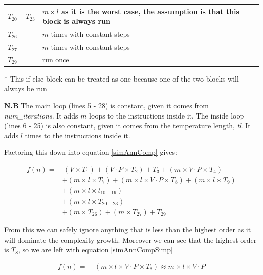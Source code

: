 \documentclass[12pt]{report}
\begin{document}
\begin{table}[H]
\begin{tabular}{@{}|l|l|@{}}
$T_{20} - T_{23}$ & $m \times l$ as it is the worst case, the assumption is that this block is always run                                       \\ \midrule
$T_{26}$          & $m$ times with constant steps                                                                                               \\ \midrule
$T_{27}$          & $m$ times with constant steps                                                                                               \\ \midrule
$T_{29}$          & run once                                                                                                                    \\ \bottomrule
\end{tabular}
\end{table}

* This if-else block can be treated as one because one of the two blocks will always be run

\textbf{N.B} The main loop (lines 5 - 28) is constant, given it comes from \textit{num\_iterations}. It adds $m$ loops to the instructions inside it. The inside loop (lines 6 - 25) is also constant, given it comes from the temperature length, \textit{tl}. It adds $l$ times to the instructions inside it.

Factoring this down into equation \ref{simAnnComp} gives: 

\begin{equation}\label{simAnnComp}
\begin{aligned}
	f(n) ={} & \ (V \times T_1) + (V \cdot P \times T_2) + T_3  + (m \times V \cdot P \times T_4) \\
	 	& + (m \times l \times T_7) + (m \times l \times V \cdot P  \times T_8) + (m \times l \times T_9) \\
		& + (m \times l \times t_{10 - 19}) \\
		& + (m \times l \times T_{20 - 23}) \\
		& + (m \times T_{26}) + (m \times T_{27}) + T_{29}
\end{aligned}
\end{equation}

From this we can safely ignore anything that is less than the highest order as it will dominate the complexity growth. Moreover we can see that the highest order is $T_8$, so we are left with equation \ref{simAnnCompSimp}

\begin{equation}\label{simAnnCompSimp}
\begin{aligned}
	f(n) ={} & \ (m \times l \times V \cdot P \times T_8) \approx m \times l \times V \cdot P
\end{aligned}
\end{equation}
\end{document}
